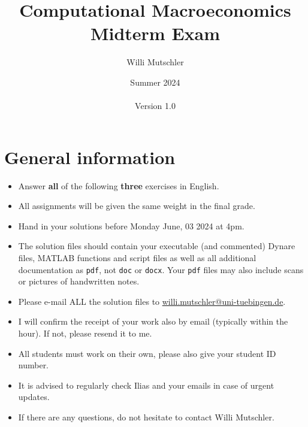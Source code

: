 \documentclass[a4paper]{scrartcl}
\begin{document}
	
\title{Computational Macroeconomics\\Midterm Exam}
\author{Willi Mutschler}
\date{Summer 2024\\~\\Version 1.0}
\maketitle

\section*{General information}

\begin{itemize}
\item
Answer \textbf{all} of the following \textbf{three} exercises in English.
\item
All assignments will be given the same weight in the final grade.
\item
Hand in your solutions before Monday June, 03 2024 at 4pm.
\item
The solution files should contain your executable (and commented) Dynare files, MATLAB functions and script files
  as well as all additional documentation as \texttt{pdf}, not \texttt{doc} or \texttt{docx}.
Your \texttt{pdf} files may also include scans or pictures of handwritten notes.
\item
Please e-mail ALL the solution files to \url{willi.mutschler@uni-tuebingen.de}.
\item
I will confirm the receipt of your work also by email (typically within the hour). If not, please resend it to me.
\item
All students must work on their own, please also give your student ID number.
\item
It is advised to regularly check Ilias and your emails in case of urgent updates.
\item
If there are any questions, do not hesitate to contact Willi Mutschler.
\end{itemize}


\newpage
\end{document}
